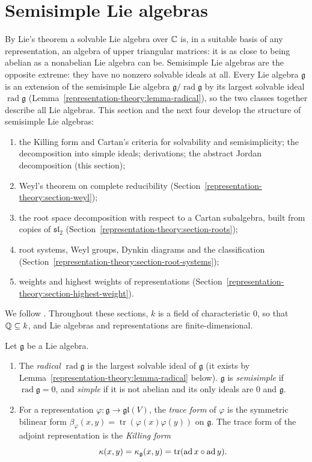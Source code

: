 \section{Semisimple Lie algebras}\label{representation-theory:section-semisimple}

By Lie's theorem a solvable Lie algebra over $\mathbb{C}$ is, in a suitable basis of any representation, an algebra of upper triangular matrices: it is as close to being abelian as a
nonabelian Lie algebra can be. Semisimple Lie algebras are the opposite extreme: they have no nonzero solvable ideals at all. Every Lie algebra $\mathfrak{g}$ is an extension
of the semisimple Lie algebra $\mathfrak{g}/\operatorname{rad}\mathfrak{g}$ by its largest solvable ideal $\operatorname{rad}\mathfrak{g}$
(Lemma~\ref{representation-theory:lemma-radical}), so the two classes together describe all Lie algebras. This section and the next four develop the structure of semisimple
Lie algebras:
\begin{enumerate}
\item the Killing form and Cartan's criteria for solvability and semisimplicity; the decomposition into simple ideals; derivations; the abstract Jordan decomposition
(this section);
\item Weyl's theorem on complete reducibility (Section~\ref{representation-theory:section-weyl});
\item the root space decomposition with respect to a Cartan subalgebra, built from copies of $\mathfrak{sl}_2$ (Section~\ref{representation-theory:section-roots});
\item root systems, Weyl groups, Dynkin diagrams and the classification (Section~\ref{representation-theory:section-root-systems});
\item weights and highest weights of representations (Section~\ref{representation-theory:section-highest-weight}).
\end{enumerate}
We follow \cite[Chapters II--III and VI]{humphreys-lie}. Throughout these sections, $k$ is a field of characteristic $0$, so that $\mathbb{Q} \subseteq k$, and Lie algebras and
representations are finite-dimensional.

\begin{definition}\label{representation-theory:definition-semisimple}
Let $\mathfrak{g}$ be a Lie algebra.
\begin{enumerate}
\item The \emph{radical} $\operatorname{rad}\mathfrak{g}$ is the largest solvable ideal of $\mathfrak{g}$ (it exists by Lemma~\ref{representation-theory:lemma-radical} below).
$\mathfrak{g}$ is \emph{semisimple} if $\operatorname{rad}\mathfrak{g} = 0$, and \emph{simple} if it is not abelian and its only ideals are $0$ and $\mathfrak{g}$.
\item For a representation $\varphi \colon \mathfrak{g} \to \mathfrak{gl}(V)$, the \emph{trace form} of $\varphi$ is the symmetric bilinear form
$\beta_\varphi(x, y) = \operatorname{tr}(\varphi(x)\varphi(y))$ on $\mathfrak{g}$. The trace form of the adjoint representation is the \emph{Killing form}
\[
\kappa(x, y) = \kappa_{\mathfrak{g}}(x, y) = \operatorname{tr}(\operatorname{ad} x \circ \operatorname{ad} y).
\]
\end{enumerate}
\end{definition}

